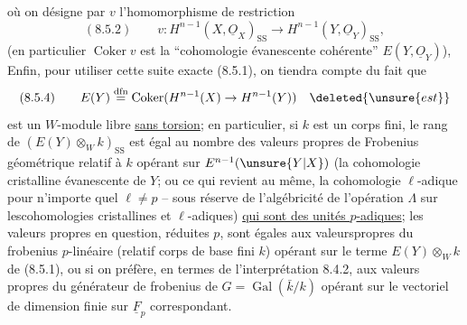 où on désigne par $v$ l'homomorphisme de restriction
\[
(8.5.2)\qquad v:H^{n-1}(X,\underline O_X)_{\mathrm{SS}}\longrightarrow H^{n-1}(Y,\underline O_Y)_{\mathrm{SS}},
\]
(en particulier $\operatorname{Coker}v$ est la ``cohomologie évanescente cohérente'' $E(Y,\underline O_Y)$), 
Enfin, pour utiliser cette suite exacte (8.5.1), on tiendra compte du fait que
\[
(8.5.4)\qquad E(Y)\overset{\mathrm{dfn}}=\operatorname{Coker}(H^{n-1}(X)\to H^{n-1}(Y))\quad\deleted{\unsure{est}}
\]
est un $W$-module libre \uline{sans torsion}; en particulier, si $k$ est un corps fini, le rang de $(E(Y)\otimes_W k)_{\mathrm{SS}}$ est égal au nombre des valeurs propres de Frobenius géométrique relatif à $k$ opérant sur $E^{n-1}(\unsure{Y|X})$ (la cohomologie cristalline évanescente de $Y$; ou ce qui revient au même, la cohomologie $\ell$-adique pour n'importe quel $\ell\ne p$ -- sous réserve de l'algébricité de l'opération $\Lambda$ sur lescohomologies cristallines et $\ell$-adiques) \uline{qui sont des unités $p$-adiques}; les valeurs propres en question, réduites  $p$, sont égales aux valeurspropres du frobenius $p$-linéaire (relatif  corps de base fini $k$) opérant sur le terme $E(Y)\otimes_W k$ de (8.5.1), ou si on préfère, en termes de l'interprétation 8.4.2, aux valeurs propres du  générateur de frobenius de $G=\operatorname{Gal}(\bar k/k)$ opérant sur le vectoriel de dimension finie sur $\underline F_p$ correspondant.

